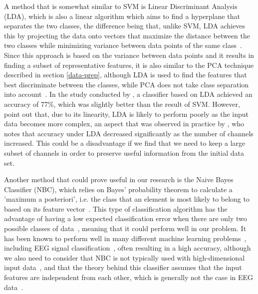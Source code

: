 \documentclass{mprop}
\begin{document}
A method that is somewhat similar to SVM is Linear Discriminant Analysis (LDA), which is also a linear algorithm which aims to find a hyperplane that separates the two classes, the difference being that, unlike SVM, LDA achieves this by projecting the data onto vectors that maximize the distance between the two classes while minimizing variance between data points of the same class~\cite{lotte_review_2007}. Since this approach is based on the variance between data points and it results in finding a subset of representative features, it is also similar to the PCA technique described in section \ref{data-prep}, although LDA is used to find the features that best discriminate between the classes, while PCA does not take class separation into account~\cite{martinez_pca_2001}. In the study conducted by \citet{vuckovic_prediction_2018}, a classifier based on LDA achieved an accuracy of 77\%, which was slightly better than the result of SVM. However, \citet{lotte_review_2007} point out that, due to its linearity, LDA is likely to perform poorly as the input data becomes more complex, an aspect that was observed in practice by \citet{gallardo_transferable_2017}, who notes that accuracy under LDA decreased significantly as the number of channels increased. This could be a disadvantage if we find that we need to keep a large subset of channels in order to preserve useful information from the initial data set.

Another method that could prove useful in our research is the Naive Bayes Classifier (NBC), which relies on Bayes' probability theorem to calculate a 'maximum a posteriori', i.e. the class that an element is most likely to belong to based on its feature vector~\cite{rish_empirical_2001}. This type of classification algorithm has the advantage of having a low expected classification error when there are only two possible classes of data~\cite{rish_empirical_2001}, meaning that it could perform well in our problem. It has been known to perform well in many different machine learning problems~\cite{rish_empirical_2001, chen_automated_2012}, including EEG signal classification~\cite{vuckovic_prediction_2018}, often resulting in a high accuracy, although we also need to consider that NBC is not typically used with high-dimensional input data~\cite{chen_automated_2012}, and that the theory behind this classifier assumes that the input features are independent from each other, which is generally not the case in EEG data~\cite{gallardo_transferable_2017}.
\end{document}
